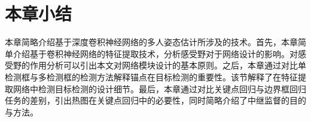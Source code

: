 \section{本章小结}
本章简略介绍基于深度卷积神经网络的多人姿态估计所涉及的技术。首先，本章简单介绍基于卷积神经网络的特征提取技术，分析感受野对于网络设计的影响。对感受野的作用分析可以引出本文对网络模块设计的基本原则。之后，本章通过对比单检测框与多检测框的检测方法解释锚点在目标检测的重要性。该节解释了在特征提取网络中检测目标检测的设计细节。最后，本章通过对比关键点回归与边界框回归任务的差别，引出热图在关键点回归中的必要性，同时简略介绍了中继监督的目的与方法。
